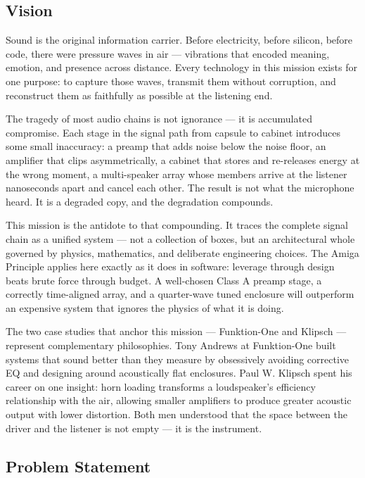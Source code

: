 \documentclass[11pt,letterpaper]{article}
\begin{document}
\subsection{Vision}

Sound is the original information carrier. Before electricity, before silicon, before code, there were pressure waves in air --- vibrations that encoded meaning, emotion, and presence across distance. Every technology in this mission exists for one purpose: to capture those waves, transmit them without corruption, and reconstruct them as faithfully as possible at the listening end.

The tragedy of most audio chains is not ignorance --- it is accumulated compromise. Each stage in the signal path from capsule to cabinet introduces some small inaccuracy: a preamp that adds noise below the noise floor, an amplifier that clips asymmetrically, a cabinet that stores and re-releases energy at the wrong moment, a multi-speaker array whose members arrive at the listener nanoseconds apart and cancel each other. The result is not what the microphone heard. It is a degraded copy, and the degradation compounds.

This mission is the antidote to that compounding. It traces the complete signal chain as a unified system --- not a collection of boxes, but an architectural whole governed by physics, mathematics, and deliberate engineering choices. The Amiga Principle applies here exactly as it does in software: leverage through design beats brute force through budget. A well-chosen Class A preamp stage, a correctly time-aligned array, and a quarter-wave tuned enclosure will outperform an expensive system that ignores the physics of what it is doing.

The two case studies that anchor this mission --- Funktion-One and Klipsch --- represent complementary philosophies. Tony Andrews at Funktion-One built systems that sound better than they measure by obsessively avoiding corrective EQ and designing around acoustically flat enclosures. Paul W. Klipsch spent his career on one insight: horn loading transforms a loudspeaker's efficiency relationship with the air, allowing smaller amplifiers to produce greater acoustic output with lower distortion. Both men understood that the space between the driver and the listener is not empty --- it is the instrument.

\subsection{Problem Statement}
\end{document}
